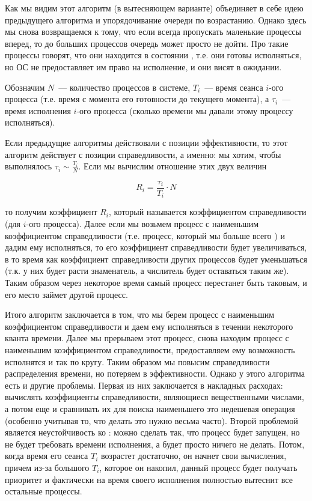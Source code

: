 Как мы видим этот алгоритм (в вытесняющем варианте) объединяет в себе идею
предыдущего алгоритма и упорядочивание очереди по возрастанию. Однако здесь мы
снова возвращаемся к тому, что если всегда пропускать маленькие процессы вперед,
то до больших процессов очередь может просто не дойти. Про такие процессы
говорят, что они находится в состоянии , т.е. они готовы
исполняться, но ОС не предоставляет им право на исполнение, и они висят в
ожидании.


Обозначим \(N\)~--- количество процессов в системе, \(T_i\)~--- время сеанса
\(i\)-ого процесса (т.е. время с момента его готовности до текущего момента), а
\(\tau_i\)~--- время исполнения \(i\)-ого процесса (сколько времени мы давали
этому процессу исполняться).

Если предыдущие алгоритмы действовали с позиции эффективности, то этот алгоритм
действует с позиции справедливости, а именно: мы хотим, чтобы выполнялось
\(\tau_i \sim \frac{T_i}{N}\). Если мы вычислим отношение этих двух величин

\begin{equation*}
  R_i = \frac{\tau_i}{T_i} \cdot N
\end{equation*}

то получим коэффициент \(R_i\), который называется коэффициентом справедливости
(для \(i\)-ого процесса). Далее если мы возьмем процесс с наименьшим
коэффициентом справедливости (т.е. процесс, который мы больше всего
) и дадим ему исполняться, то его коэффициент справедливости
будет увеличиваться, в то время как коэффициент справедливости других процессов
будет уменьшаться (т.к. у них будет расти знаменатель, а числитель будет
оставаться таким же). Таким образом через некоторое время самый
 процесс перестанет быть таковым, и его место займет другой
процесс.

Итого алгоритм заключается в том, что мы берем процесс с наименьшим
коэффициентом справедливости и даем ему исполняться в течении некоторого кванта
времени. Далее мы прерываем этот процесс, снова находим процесс с наименьшим
коэффициентом справедливости, предоставляем ему возможность исполнятся и так по
кругу. Таким образом мы повысим справедливости распределения времени, но
потеряем в эффективности. Однако у этого алгоритма есть и другие проблемы.
Первая из них заключается в накладных расходах: вычислять коэффициенты
справедливости, являющиеся вещественными числами, а потом еще и сравнивать их
для поиска наименьшего это недешевая операция (особенно учитывая то, что делать
это нужно весьма часто). Второй проблемой является неустойчивость ко
: можно сделать так, что процесс будет запущен, но не будет
требовать времени исполнения, а будет просто ничего не делать. Потом, когда
время его сеанса \(T_i\) возрастет достаточно, он начнет свои вычисления, причем
из-за большого \(T_i\), которое он накопил, данный процесс будет получать
приоритет и фактически на время своего исполнения полностью вытеснит все
остальные процессы.

